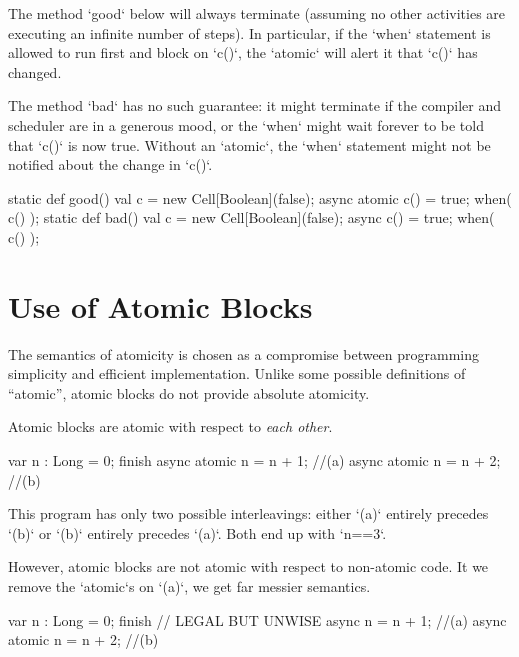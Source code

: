 \begin{ex}
The method \xcd`good` below will always terminate (assuming no other
activities are executing an infinite number of steps). In particular, if the
\xcd`when` statement is allowed to run first and block on \xcd`c()`, the
\xcd`atomic` will alert it that \xcd`c()` has changed. 

The method \xcd`bad` has
no such guarantee: it might terminate if the compiler and scheduler are in a
generous mood, or the \xcd`when` might wait forever to be told that \xcd`c()`
is now true.   Without an \xcd`atomic`, the \xcd`when` statement might not be
notified about the change in \xcd`c()`.  
\begin{xten}
static def good() {
  val c = new Cell[Boolean](false);
  async {
    atomic {c() = true;}
  }
  when( c() ); 
}
static def bad() {
  val c = new Cell[Boolean](false);
  async {
    c() = true;
  }
  when( c() ); 
}
\end{xten}


\end{ex}

\section{Use of Atomic Blocks}
The semantics of atomicity is chosen as a compromise between programming
simplicity and efficient implementation.  Unlike some possible definitions of
``atomic'', atomic blocks do not provide absolute atomicity.  

Atomic blocks are atomic with respect to {\em each other}.
\begin{xten}
var n : Long = 0;
finish {
  async atomic n = n + 1; //(a)
  async atomic n = n + 2; //(b)
}
\end{xten}
This program has only two possible interleavings: either \xcd`(a)` entirely
precedes \xcd`(b)` or \xcd`(b)` entirely precedes \xcd`(a)`.  Both end up with
\xcd`n==3`. 


However, atomic blocks are not atomic with respect to non-atomic code.  It we
remove the  \xcd`atomic`s on \xcd`(a)`, we get far messier semantics.
\begin{xten}
var n : Long = 0;
finish {
  // LEGAL BUT UNWISE 
  async n = n + 1;          //(a)
  async atomic n = n + 2;   //(b)
}
\end{xten}

